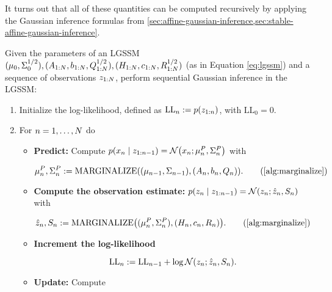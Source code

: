 \documentclass{mimosis}
\begin{document}
It turns out that all of these quantities can be computed recursively
by applying the Gaussian inference formulas from
\cref{sec:affine-gaussian-inference,sec:stable-affine-gaussian-inference}.

\begin{alg}
\algeqspacing
\label{alg:lgssm-inference}
Given the parameters of an LGSSM
\((\mu_{0}, \Sigma_{0}^{1/2}), (A_{1:N}, b_{1:N}, Q_{1:N}^{1/2}), (H_{1:N}, c_{1:N}, R_{1:N}^{1/2})\)
(as in Equation \ref{eq:lgssm})
and a sequence of observations \(z_{1:N}\),
perform sequential Gaussian inference in the LGSSM:
\begin{enumerate}[nosep]
\item Initialize the log-likelihood, defined as \(\text{LL}_\idxt := \p(\obs_{1:\idxt})\), with
\(\text{LL}_0 = 0\).
\item For \(n = 1, \dots, N\) do
\begin{itemize}
\item \textbf{Predict:} Compute
\(\p(\st_\idxt \mid \obs_{1:\idxt-1}) = \N( \st_\idxt; \mean{\idxt}^P, \cov{\idxt}^P )\)
with
\begin{fleqn}
\begin{equation*}
  \mean{\idxt}^P, \cov{\idxt}^P := \operatorname{MARGINALIZE}\left(
    (\mean{{\idxt-1}}, \cov{{\idxt-1}}),
    (\transA_\idxt, \transb_\idxt, \transC_\idxt)
  \right).
  \tag{\cref{alg:marginalize}}
\end{equation*}
\end{fleqn}
\item \textbf{Compute the observation estimate:}
\(\p(\obs_\idxt \mid \obs_{1:\idxt-1}) = \N( \obs_\idxt; \hat{\obs}_\idxt, S_\idxt )\)
with
\begin{fleqn}
\begin{equation*}
  \hat{\obs}_\idxt, S_\idxt := \operatorname{MARGINALIZE}\left(
    (\mean{\idxt}^P, \cov{\idxt}^P),
    (\obsA_\idxt, \obsb_\idxt, \obsC_\idxt)
  \right).
  \tag{\cref{alg:marginalize}}
\end{equation*}
\end{fleqn}
\item \textbf{Increment the log-likelihood}
\begin{fleqn}
\begin{equation*}
 \text{LL}_\idxt := \text{LL}_{\idxt-1} + \log \N( \obs_\idxt; \hat{\obs}_\idxt, S_\idxt ).
\end{equation*}
\end{fleqn}
\item \textbf{Update:} Compute

\end{itemize}
\end{enumerate}
\end{alg}
\end{document}
